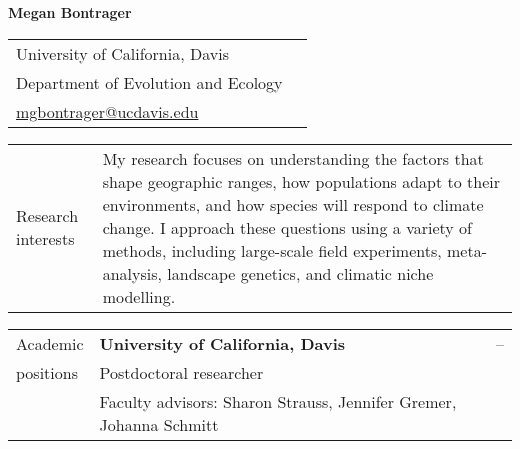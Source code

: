 \documentclass[letterpaper,11pt,oneside]{article}
\begin{document}



\noindent  \LARGE{\textbf{Megan Bontrager}} 

\normalsize

\bigskip

\noindent \begin{tabular}{@{} p{8cm} >{\raggedleft\arraybackslash}p{8.11cm}}
University of California, Davis & \\
Department of Evolution and Ecology & \\
{\href{mailto:mgbontrager@ucdavis.edu}{mgbontrager@ucdavis.edu}} & \\
\end{tabular}
\vspace{1em}


\noindent\hrulefill 

\bigskip
\bigskip



\noindent \begin{tabular}{@{} p{3cm} p{13.11cm}}
\Large{Research interests} & My research focuses on understanding the factors that shape geographic ranges, how populations adapt to their environments, and how species will respond to climate change. I approach these questions using a variety of methods, including large-scale field experiments, meta-analysis, landscape genetics, and climatic niche modelling. \\
\end{tabular}
\bigskip



\noindent \begin{tabular}{@{} p{3cm} p{11.21cm} >{\raggedleft\arraybackslash}p{1.7cm}}
\Large{Academic}    & \textbf{University of California, Davis} & 2018--\hspace*{0.8cm} \\
\Large{positions}   & Postdoctoral researcher & \\
& \raggedright{Faculty advisors: Sharon Strauss, Jennifer Gremer, Johanna Schmitt} & \\
\end{tabular}
\bigskip


\end{document}
